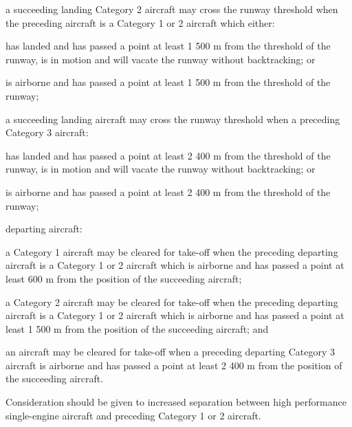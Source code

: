 \begin{enumnoss}
\begin{enumalph}
\begin{enumarab}
            \item a succeeding landing Category 2 aircraft may cross the runway threshold when the preceding aircraft is a Category 1 or 2 aircraft which either:

            \begin{enumroman}
                \item has landed and has passed a point at least 1 500 m from the threshold of the runway, is in motion and will vacate the runway without backtracking; or
                \item is airborne and has passed a point at least 1 500 m from the threshold of the runway;
            \end{enumroman}

            \item a succeeding landing aircraft may cross the runway threshold when a preceding Category 3 aircraft:

            \begin{enumroman}
                \item has landed and has passed a point at least 2 400 m from the threshold of the runway, is in motion and will vacate the runway without backtracking; or
                \item is airborne and has passed a point at least 2 400 m from the threshold of the runway;
            \end{enumroman}
        \end{enumarab}

        \item departing aircraft:
        \begin{enumarab}
            \item a Category 1 aircraft may be cleared for take-off when the preceding departing aircraft is a Category 1 or 2 aircraft which is airborne and has passed a point at least 600 m from the position of the succeeding aircraft;
            \item a Category 2 aircraft may be cleared for take-off when the preceding departing aircraft is a Category 1 or 2 aircraft which is airborne and has passed a point at least 1 500 m from the position of the succeeding aircraft; and
            \item an aircraft may be cleared for take-off when a preceding departing Category 3 aircraft is airborne and has passed a point at least 2 400 m from the position of the succeeding aircraft.
        \end{enumarab}
    \end{enumalph}

    \begin{enumnoss}
        \item Consideration should be given to increased separation between high performance single-engine aircraft and preceding Category 1 or 2 aircraft.
    \end{enumnoss}
\end{enumnoss}

